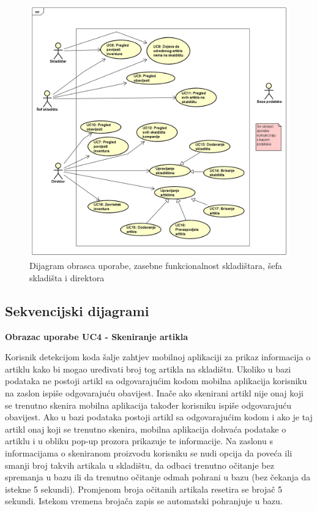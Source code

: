 					\begin{figure}[H]
						\includegraphics[scale=0.5]{slike/uc2.png}
						\caption{Dijagram obrasca uporabe, zasebne funkcionalnost skladištara, šefa skladišta i direktora}
					\end{figure}
				
			\subsection{Sekvencijski dijagrami}
				
				\textbf{Obrazac uporabe UC4 - Skeniranje artikla}
				
				Korisnik detekcijom koda šalje zahtjev mobilnoj aplikaciji za prikaz informacija o artiklu kako bi mogao uređivati broj tog artikla na skladištu. Ukoliko u bazi podataka ne postoji artikl sa odgovarajućim kodom mobilna aplikacija korisniku na zaslon ispiše odgovarajuću obavijest. Inače ako skenirani artikl nije onaj koji se trenutno skenira mobilna aplikacija također korisniku ispiše odgovarajuću obavijest. Ako u bazi podataka postoji artikl sa odgovarajućim kodom i ako je taj artikl onaj koji se trenutno skenira, mobilna aplikacija dohvaća podatake o artiklu i u obliku pop-up prozora prikazuje te informacije. Na zaslonu s informacijama o skeniranom proizvodu korisniku se nudi opcija da poveća ili smanji broj takvih artikala u skladištu, da odbaci trenutno očitanje bez spremanja u bazu ili da trenutno očitanje odmah pohrani u bazu (bez čekanja da istekne 5 sekundi). Promjenom broja očitanih artikala resetira se brojač 5 sekundi. Istekom vremena brojača zapis se automatski pohranjuje u bazu.
				
